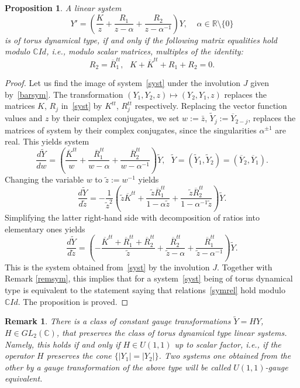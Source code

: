 \documentclass[preprint,12pt]{elsarticle}
\theoremstyle{plain}
\newtheorem{proposition}[theorem]{Proposition}
\newtheorem{remark}[theorem]{Remark}
\def\wt#1{\widetilde#1}
\numberwithin{equation}{section}
\numberwithin{equation}{section}
\begin{document}
\begin{proposition} \label{psym} A linear system 
\begin{equation}Y'=\left(\frac{K}z +\frac{R_1}{z-\alpha}+\frac{R_2}{z-\alpha^{-1}}\right)Y\label{syst}, \ \ \ \ \ \alpha\in\mathbb R\setminus\{0\}
\end{equation}
is of torus dynamical type, if and only if the following matrix equalities hold  modulo $\mathbb{C} Id$, i.e., 
modulo scalar matrices, multiples of the identity:
\begin{equation}R_2=\overline R_1^{tt}, \ \ \ K+\overline K^{tt}+R_1+R_2=0.
\label{symrel}\end{equation}
\end{proposition}
\begin{proof} Let us find the image of system~\eqref{syst} under the involution $J$ given by~\eqref{barsym}. 
The transformation $(Y_1,Y_2,z)\mapsto(Y_2,Y_1,z)$ replaces the matrices $K$, $R_j$ in~\eqref{syst} by 
$K^{tt}$, $R_j^{tt}$ respectively. Replacing the vector function values and $z$ by their complex conjugates, 
we set $w:=\bar z$, $\wt Y_j:=\overline Y_{2-j}$,  
replaces the matrices of system by their complex conjugates, since the singularities $\alpha^{\pm1}$ are real. This  
yields system 
\begin{equation}\frac{d\wt Y}{dw}=\left(\frac{\overline K^{tt}}w +\frac{\overline R_1^{tt}}{w-\alpha}+\frac{\overline R_2^{tt}}{w-\alpha^{-1}}\right)\wt Y, \ \ \ \wt Y=(\wt Y_1,\wt Y_2)=(\overline Y_2, \overline Y_1).\label{syst2}
\end{equation}
Changing the variable $w$ to $\wt z:=w^{-1}$ yields 
$$\frac{d\wt Y}{d\wt z}=-\frac1{\wt z^2}\left(\wt z \overline K^{tt} +\frac{\wt z\overline R_1^{tt}}{1-\alpha\wt z}+\frac{\wt z\overline R_2^{tt}}{1-\alpha^{-1}\wt z}\right)\wt Y.$$
Simplifying the latter right-hand side with decomposition of ratios into elementary ones yields
\begin{equation}\frac{d\wt Y}{d\wt z}=\left(-\frac{\overline K^{tt}+\overline R_1^{tt}+\overline R_2^{tt}}{\wt z} +\frac{\overline R_2^{tt}}{\wt z-\alpha}+\frac{\overline R_1^{tt}}{\wt z-\alpha^{-1}}\right)\wt Y.\label{syst3}\end{equation}
This is the system obtained from~\eqref{syst} by the involution $J$. Together with Remark \ref{remsym}, this 
implies that for a system~\eqref{syst} being of torus dynamical type is equivalent to the statement saying 
that relations~\eqref{symrel} hold modulo $\mathbb{C} Id$. The proposition is proved.
\end{proof}
\begin{remark}
There is a class of constant gauge transformations $\wt Y=HY$, $H\in GL_2(\mathbb{C})$, that preserves 
the class of torus dynamical type linear systems. Namely, this holds if and only if $H\in U(1,1)$ up to scalar factor, i.e., if 
the operator $H$ preserves the cone $\{|Y_1|=|Y_2|\}$. Two systems one obtained from the other by a gauge 
transformation of the above type will be called {\it $U(1,1)$-gauge equivalent.}
\end{remark}
 
\end{document}
